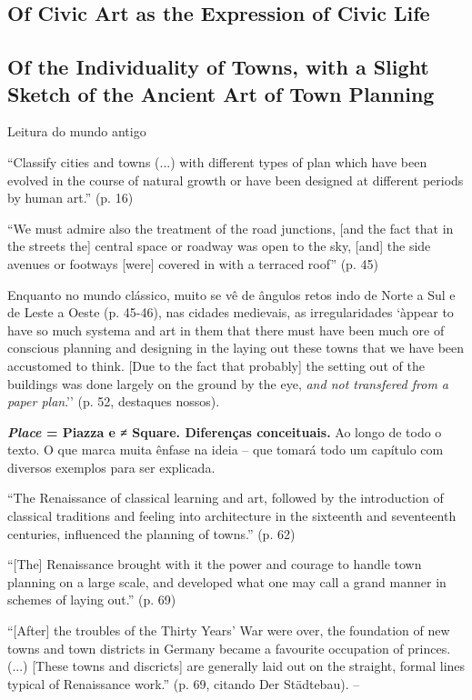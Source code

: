 \documentclass[12pt, a4paper]{book} %
\begin{document}
        \subsection*{Of Civic Art as the Expression of Civic Life}
        \subsection*{Of the Individuality of Towns, with a Slight Sketch of the Ancient Art of Town Planning}

        Leitura do mundo antigo

        ``Classify cities and towns (...) with different types of plan which have been evolved in the course of natural growth or have been designed at different periods by human art.'' (p. 16)

        ``We must admire also the treatment of the road junctions, [and the fact that in the streets the] central space or roadway was open to the sky, [and] the side avenues or footways [were] covered in with a terraced roof'' (p. 45)

        Enquanto no mundo clássico, muito se vê de ângulos retos indo de Norte a Sul e de Leste a Oeste (p. 45-46), nas cidades medievais, as irregularidades `àppear to have so much systema and art in them that there must have been much ore of conscious planning and designing in the laying out these towns that we have been accustomed to think. [Due to the fact that probably] the setting out of the buildings was done largely on the ground by the eye, \textit{and not transfered from a paper plan}.'' (p. 52, destaques nossos).

        \textbf{\textit{Place} = Piazza e ≠ Square. Diferenças conceituais.} Ao longo de todo o texto. O que marca muita ênfase na ideia – que tomará todo um capítulo com diversos exemplos para ser explicada.

        ``The Renaissance of classical learning and art, followed by the introduction of classical traditions and feeling into architecture in the sixteenth and seventeenth centuries, influenced the planning of towns.'' (p. 62)

        ``[The] Renaissance brought with it the power and courage to handle town planning on a large scale, and developed what one may call a grand manner in schemes of laying out.'' (p. 69)

        ``[After] the troubles of the Thirty Years' War were over, the foundation of new towns and town districts in Germany became a favourite occupation of princes. (...) [These towns and discricts] are generally laid out on the straight, formal lines typical of Renaissance work.'' (p. 69, citando Der Städtebau). – %
\end{document}
